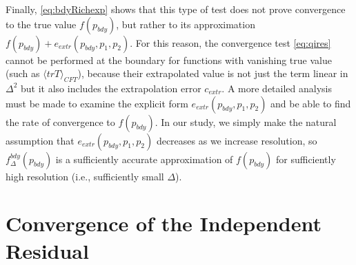 \documentclass[aps,letterpaper,twocolumn,nofootinbib]{revtex4}
\numberwithin{equation}{section}
\begin{document}
Finally, \eqref{eq:bdyRichexp} shows that this type of test does not prove convergence to the true value $f(p_{bdy})$, but rather to its approximation $f(p_{bdy})+e_{extr}(p_{bdy},p_1,p_2)$. For this reason, the convergence test \eqref{eq:qires} cannot be performed at the boundary for functions with vanishing true value (such as $\langle trT \rangle_{CFT}$), because their extrapolated value is not just the term linear in $\Delta^2$ but it also includes the extrapolation error $c_{extr}$. A more detailed analysis must be made to examine the explicit form $e_{extr}(p_{bdy},p_1,p_2)$ and be able to find the rate of convergence to $f(p_{bdy})$. In our study, we simply make the natural assumption that $e_{extr}(p_{bdy},p_1,p_2)$ decreases as we increase resolution, so $f^{bdy}_{\Delta}(p_{bdy})$ is a sufficiently accurate approximation of $f(p_{bdy})$ for sufficiently high resolution (i.e., sufficiently small $\Delta$).


\section{Convergence of the Independent Residual}\label{sec:convbulk}
\end{document}
